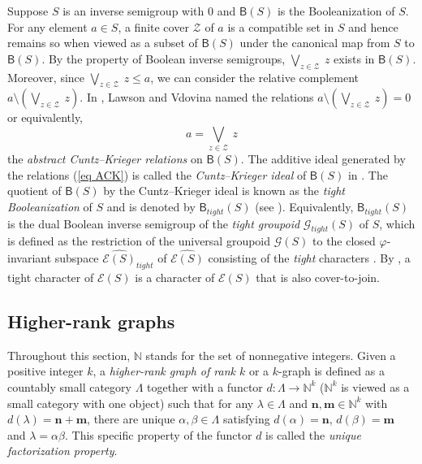 \documentclass[a4paper,reqno,11pt]{amsart}
\numberwithin{equation}{section}
\theoremstyle{definition}
\theoremstyle{remark}
\newcommand{\N}{\mathbf{n}}
\newcommand{\M}{\mathbf{m}}
\begin{document}
Suppose $S$ is an inverse semigroup with $0$ and $\mathsf{B}(S)$ is the Booleanization of $S$. For any element $a\in S$, a finite cover $\mathcal{Z}$ of $a$ is a compatible set in $S$ and hence remains so when viewed as a subset of $\mathsf{B}(S)$ under the canonical map from $S$ to $\mathsf{B}(S)$. By the property of Boolean inverse semigroups, $\displaystyle{\bigvee_{z\in \mathcal{Z}}}~z$ exists in $\mathsf{B}(S)$. Moreover, since $\displaystyle{\bigvee_{z\in \mathcal{Z}}}~z\le a$, we can consider the relative complement $a\setminus \left(\displaystyle{\bigvee_{z\in \mathcal{Z}}}~z\right)$. In \cite{LawsonCK}, Lawson and Vdovina named the relations $a\setminus \left(\displaystyle{\bigvee_{z\in \mathcal{Z}}}~z\right)=0$ or equivalently, 
\begin{equation}\label{eq ACK}
a=\displaystyle{\bigvee_{z\in \mathcal{Z}}}~z
\end{equation}
the \emph{abstract Cuntz--Krieger relations} on $\mathsf{B}(S)$. The additive ideal generated by the relations (\ref{eq ACK}) is called the \emph{Cuntz--Krieger ideal} of $\mathsf{B}(S)$ in \cite{LawsonCK}. The quotient of $\mathsf{B}(S)$ by the Cuntz--Krieger ideal is known as the \emph{tight Booleanization} of $S$ and is denoted by $\mathsf{B}_{tight}(S)$ (see \cite{GannaX,Ganna}). Equivalently, $\mathsf{B}_{tight}(S)$ is the dual Boolean inverse semigroup of the \emph{tight groupoid} $\mathcal{G}_{tight}(S)$ of $S$, which is defined as the restriction of the universal groupoid $\mathcal{G}(S)$ to the closed $\varphi$-invariant subspace $\widehat{\mathcal{E}(S)}_{tight}$ of $\widehat{\mathcal{E}(S)}$ consisting of the \emph{tight} characters \cite{Exel}. By \cite[Theorem 2.2]{Milan}, a tight character of $\mathcal{E}(S)$ is a character of $\mathcal{E}(S)$ that is also cover-to-join.  

\subsection{Higher-rank graphs}\label{ssec higher-rank graphs}
Throughout this section, $\mathbb{N}$ stands for the set of nonnegative integers. Given a positive integer $k$, a \emph{higher-rank graph of rank $k$} or a $k$-graph is defined as a countably small category $\Lambda$ together with a functor $d:\Lambda\longrightarrow \mathbb{N}^k$ ($\mathbb{N}^k$ is viewed as a small category with one object) such that for any $\lambda\in \Lambda$ and $\N,\M\in \mathbb{N}^k$ with $d(\lambda)=\N+\M$, there are unique $\alpha,\beta\in \Lambda$ satisfying $d(\alpha)=\N$, $d(\beta)=\M$ and $\lambda=\alpha\beta$. This specific property of the functor $d$ is called the \emph{unique factorization property}.
\end{document}
